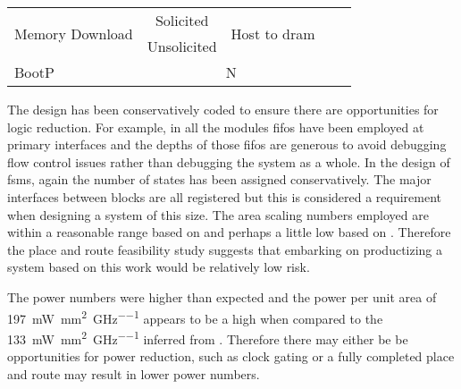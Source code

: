 \begin{table}[h]
\begin{minipage}{1\textwidth}
\begin{tabular}{ |m{4cm}|c|c|c|m{3cm}|}
 \multirow{2}{*}{Memory Download}       &   Solicited   & \multirow{2}{*}{Host to \ac{dram}} &                         &                                                                        \\\cline{2-2}
                                        &   Unsolicited &                                    &                         &                                                                        \\\cline{1-3}
        BootP                           &   \multicolumn{2}{c|}{N}                           &                         &                                                                        \\\cline{1-5}
          \end{tabular}
  \end{minipage}
  \captionsetup{justification=centering, skip=9pt}
  \vspace{0.0cm}
  \label{tab:Features implemented}
\end{table}

The design has been conservatively coded to ensure there are opportunities for logic reduction. For example, in all the modules \acp{fifo} have been employed at primary interfaces and the depths of those \acp{fifo} are generous 
to avoid debugging flow control issues rather than debugging the system as a whole.
In the design of \acp{fsm}, again the number of states has been assigned conservatively.
The major interfaces between blocks are all registered but this is considered a requirement when designing a system of this size.
The area scaling numbers employed are within a reasonable range based on \cite{schabel2017energy} and perhaps a little low based on \cite{schabel2014diss}.
Therefore the place and route feasibility study suggests that embarking on productizing a system based on this work would be relatively low risk.

The power numbers were higher than expected %
and the power per unit area of \SI[per-mode=symbol]{197}{\milli\watt\per\square\milli\meter\per\giga\hertz} appears to be a high when compared to the \SI[per-mode=symbol]{133}{\milli\watt\per\square\milli\meter\per\giga\hertz} inferred from \cite{tensorflow2015-whitepaper}.
Therefore there may either be be opportunities for power reduction, such as clock gating or a fully completed place and route may result in lower power numbers.



